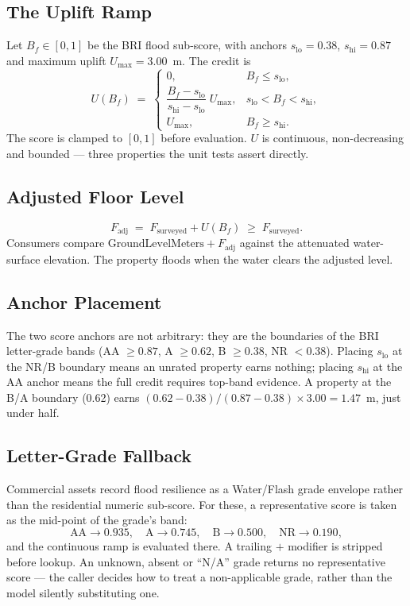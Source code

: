 \documentclass[11pt,a4paper]{article}
\begin{document}
\mkmframework

\subsection{The Uplift Ramp}
Let $B_f \in [0,1]$ be the BRI flood sub-score, with anchors
$s_{\text{lo}} = 0.38$, $s_{\text{hi}} = 0.87$ and maximum uplift
$U_{\max} = 3.00$~m. The credit is
\[
  U(B_f) \;=\;
  \begin{cases}
    0, & B_f \le s_{\text{lo}}, \\[4pt]
    \dfrac{B_f - s_{\text{lo}}}{s_{\text{hi}} - s_{\text{lo}}}\; U_{\max},
       & s_{\text{lo}} < B_f < s_{\text{hi}}, \\[8pt]
    U_{\max}, & B_f \ge s_{\text{hi}}.
  \end{cases}
\]
The score is clamped to $[0,1]$ before evaluation. $U$ is continuous,
non-decreasing and bounded --- three properties the unit tests assert directly.

\subsection{Adjusted Floor Level}
\[
  F_{\text{adj}} \;=\; F_{\text{surveyed}} + U(B_f) \;\ge\; F_{\text{surveyed}}.
\]
Consumers compare $\text{GroundLevelMeters} + F_{\text{adj}}$ against the
attenuated water-surface elevation. The property floods when the water clears
the adjusted level.

\subsection{Anchor Placement}
The two score anchors are not arbitrary: they are the boundaries of the BRI
letter-grade bands (AA $\ge 0.87$, A $\ge 0.62$, B $\ge 0.38$, NR $< 0.38$).
Placing $s_{\text{lo}}$ at the NR/B boundary means an unrated property earns
nothing; placing $s_{\text{hi}}$ at the AA anchor means the full credit requires
top-band evidence. A property at the B/A boundary (0.62) earns
$(0.62-0.38)/(0.87-0.38) \times 3.00 = 1.47$~m, just under half.

\subsection{Letter-Grade Fallback}
Commercial assets record flood resilience as a Water/Flash grade envelope rather
than the residential numeric sub-score. For these, a representative score is
taken as the mid-point of the grade's band:
\[
  \text{AA} \to 0.935,\quad \text{A} \to 0.745,\quad
  \text{B} \to 0.500,\quad \text{NR} \to 0.190,
\]
and the continuous ramp is evaluated there. A trailing $+$ modifier is stripped
before lookup. An unknown, absent or ``N/A'' grade returns no representative
score --- the caller decides how to treat a non-applicable grade, rather than
the model silently substituting one.
\end{document}

